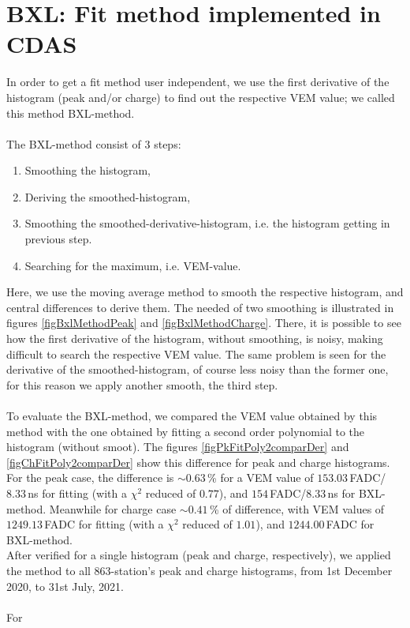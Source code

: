 \documentclass[twoside, final, 10pt]{articleMine}
\begin{document}
\section*{BXL: Fit method implemented in CDAS}
In order to get a fit method user independent, we use the first
derivative of the histogram (peak and/or charge) to find out the
respective VEM value; we called this method BXL-method.\\\\The
BXL-method consist of 3 steps:
\begin{enumerate}
  \item Smoothing the histogram,
  \item Deriving the smoothed-histogram,
  \item Smoothing the smoothed-derivative-histogram, i.e. the
    histogram getting in previous step.
  \item Searching for the maximum, i.e. VEM-value.
\end{enumerate}
Here, we use the moving average method to smooth the respective
histogram, and central differences to derive them. The needed of
two smoothing is illustrated in figures \ref{figBxlMethodPeak}
and \ref{figBxlMethodCharge}. There, it is possible to see how
the first derivative of the histogram, without smoothing, is
noisy, making difficult to search the respective VEM value. The
same problem is seen for the derivative of the
smoothed-histogram, of course less noisy than the former one, for
this reason we apply another smooth, the third step.\\\\To
evaluate the BXL-method, we compared the VEM value obtained by
this method with the one obtained by fitting a second order
polynomial to the histogram (without smoot). The figures
\ref{figPkFitPoly2comparDer} and \ref{figChFitPoly2comparDer}
show this difference for peak and charge histograms. For the peak
case, the difference is $\sim0.63$\,\% for a VEM value of
$153.03$\,FADC/$8.33$\,ns for fitting (with a $\chi^2$ reduced of
$0.77$), and $154$\,FADC/$8.33$\,ns for BXL-method. Meanwhile for
charge case $\sim0.41$\,\% of difference, with VEM values of
$1249.13$\,FADC for fitting (with a $\chi^2$ reduced of
$1.01$), and $1244.00$\,FADC for BXL-method.\\After verified
for a single histogram (peak and charge, respectively), we
applied the method to all 863-station's peak and charge
histograms, from 1st December 2020, to 31st July, 2021.\\\\For
\end{document}
